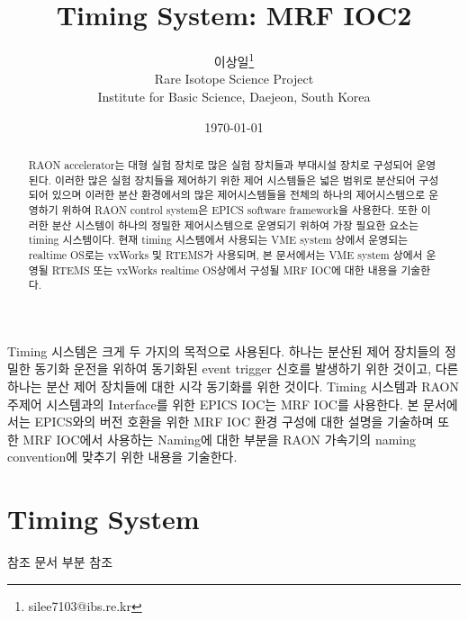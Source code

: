 \documentclass[11pt
  , a4paper
  , article
  , oneside
]{memoir}
\begin{document}
\newcommand{\technumber}{
  RAON Control-Document Series\\
  Revision : v1.0,   Release : 2014-12-24 fixed date}
\title{\textbf{Timing System: MRF IOC2}}

\author{이상일\thanks{silee7103@ibs.re.kr} \\

  Rare Isotope Science Project\\
  Institute for Basic Science, Daejeon, South Korea
}
\date{\today}

\renewcommand{\maketitlehooka}{\begin{flushright}\textsf{\technumber}\end{flushright}}

\maketitle

\begin{abstract}
RAON accelerator는 대형 실험 장치로 많은 실험 장치들과 부대시설 장치로 구성되어 운영된다. 이러한 많은 실험 장치들을 제어하기 위한 제어 시스템들은 넓은 범위로 분산되어 구성되어 있으며 이러한 분산 환경에서의 많은 제어시스템들을 전체의 하나의 제어시스템으로 운영하기 위하여 RAON control system은 EPICS software framework을 사용한다. 또한 이러한 분산 시스템이 하나의 정밀한 제어시스템으로 운영되기 위하여 가장 필요한 요소는 timing 시스템이다. 현재 timing 시스템에서 사용되는 VME system 상에서 운영되는 realtime OS로는 vxWorks 및 RTEMS가 사용되며, 본 문서에서는 VME system 상에서 운영될 RTEMS 또는 vxWorks realtime OS상에서 구성될 MRF IOC에 대한 내용을 기술한다.
\end{abstract}

Timing 시스템은 크게 두 가지의 목적으로 사용된다. 하나는 분산된 제어 장치들의 정밀한 동기화 운전을 위하여 동기화된 event trigger 신호를 발생하기 위한 것이고, 다른 하나는 분산 제어 장치들에 대한 시각 동기화를 위한 것이다. Timing 시스템과 RAON 주제어 시스템과의 Interface를 위한 EPICS IOC는 MRF IOC를 사용한다. 본 문서에서는 EPICS와의 버전 호환을 위한 MRF IOC 환경 구성에 대한 설명을 기술하며 또한 MRF IOC에서 사용하는 Naming에 대한 부분을 RAON 가속기의 naming convention에 맞추기 위한 내용을 기술한다.

\hfil\break

\chapter{Timing System}
참조 문서 부분 참조
\end{document}
